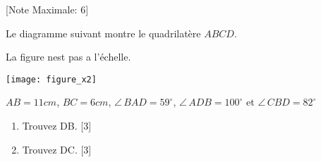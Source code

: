 \begin{question}
  \hspace*{\fill} [Note Maximale: 6]\par
  \medskip
  \noindent Le diagramme suivant montre le quadrilatère $ABCD$.\par
  \medskip
  \begin{center} %
    \noindent La figure nest pas a l'échelle.\par
    \texttt{[image: figure\_x2]}\par
    \noindent $AB = 11cm$, $BC = 6cm$, $\angle\,BAD = 59^\circ$, $\angle\,ADB = 100^\circ$ et $\angle\,CBD = 82^\circ$\par
  \end{center} %

  \begin{enumerate}[label=(\alph*)]
    \item Trouvez DB.\hspace*{\fill} [3]
    \item Trouvez DC.\hspace*{\fill} [3]
  \end{enumerate}
\end{question}
